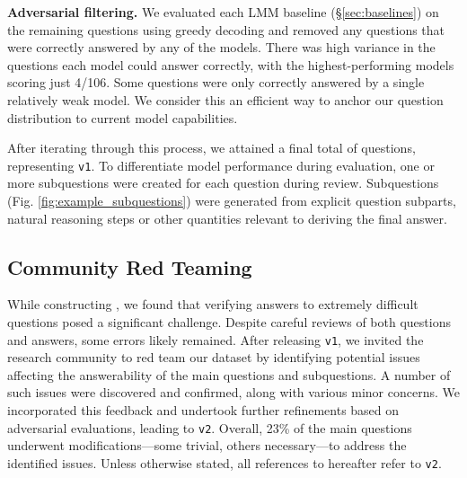 \textbf{Adversarial filtering.} We evaluated each LMM baseline (\S\ref{sec:baselines}) on the remaining questions using greedy decoding and removed any questions that were correctly answered by any of the models. There was high variance in the questions each model could answer correctly, with the highest-performing models scoring just 4/106. Some questions were only correctly answered by a single relatively weak model. We consider this an efficient way to anchor our question distribution to current model capabilities.

After iterating through this process, we attained a final total of \nquestions questions, representing \benchmarkName \texttt{v1}. To differentiate model performance during evaluation, one or more subquestions were created for each question during review. Subquestions (Fig. \ref{fig:example_subquestions}) were generated from explicit question subparts, natural reasoning steps or other quantities relevant to deriving the final answer.



\subsection{Community Red Teaming}
\label{sec:red_team}

While constructing \benchmarkName, we found that verifying answers to extremely difficult questions posed a significant challenge. Despite careful reviews of both questions and answers, some errors likely remained. After releasing \benchmarkName \texttt{v1}, we invited the research community to red team our dataset by identifying potential issues affecting the answerability of the main questions and subquestions. A number of such issues were discovered and confirmed, along with various minor concerns. We incorporated this feedback and undertook further refinements based on adversarial evaluations, leading to \benchmarkName \texttt{v2}. Overall, 23\% of the main questions underwent modifications—some trivial, others necessary—to address the identified issues. Unless otherwise stated, all references to \benchmarkName hereafter refer to \benchmarkName \texttt{v2}.

























